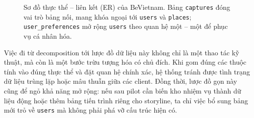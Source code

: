 \begin{figure}[H]
\centering
{}
\caption{Sơ đồ thực thể -- liên kết (ER) của BeVietnam. Bảng \texttt{captures} đóng vai trò bảng nối, mang khóa ngoại tới \texttt{users} và \texttt{places}; \texttt{user\_preferences} mở rộng \texttt{users} theo quan hệ một -- một để phục vụ cá nhân hóa.}
\label{fig:er_diagram}
\end{figure}

Việc đi từ decomposition tới lược đồ dữ liệu này không chỉ là một thao
tác kỹ thuật, mà còn là một bước trừu tượng hóa có chủ đích. Khi gom đúng
các thuộc tính vào đúng thực thể và đặt quan hệ chính xác, hệ thống tránh
được tình trạng dữ liệu trùng lặp hoặc mâu thuẫn giữa các client. Đồng
thời, lược đồ gọn này cũng để ngỏ khả năng mở rộng: nếu sau pilot cần
biến kho nhiệm vụ thành dữ liệu động hoặc thêm bảng tiến trình riêng cho
storyline, ta chỉ việc bổ sung bảng mới trỏ về \texttt{users} mà không
phải phá vỡ cấu trúc hiện có.
